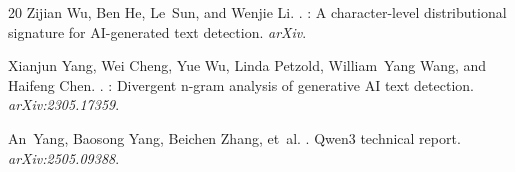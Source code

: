 \documentclass[11pt]{article}
\begin{document}
\begin{thebibliography}{20}
Zijian Wu, Ben He, Le~Sun, and Wenjie Li.
.
: A character-level distributional signature for {AI}-generated text detection.
\newblock \emph{arXiv}.

Xianjun Yang, Wei Cheng, Yue Wu, Linda Petzold, William~Yang Wang, and Haifeng Chen.
.
: Divergent n-gram analysis of generative {AI} text detection.
\newblock \emph{arXiv:2305.17359}.

An~Yang, Baosong Yang, Beichen Zhang, et~al.
.
\newblock Qwen3 technical report.
\newblock \emph{arXiv:2505.09388}.

\end{thebibliography}
\end{document}
